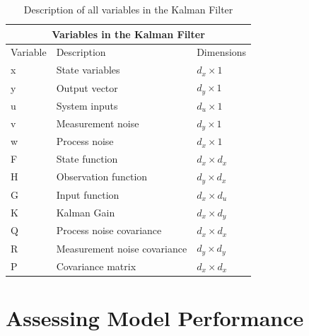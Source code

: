 \begin{center}
\begin{table}
\centering
\caption{Description of all variables in the Kalman Filter} \label{tab:sometab}
\begin{tabular}{ |p{2cm}||p{5cm}|p{2cm}| }
    \hline
    \multicolumn{3}{|c|}{Variables in the Kalman Filter } \\ 
    \hline
    Variable & Description & Dimensions \\
    \hline
    x & State variables  & $d_x \times 1$ \\
    y & Output vector  & $d_y \times 1$ \\
    u & System inputs  & $d_u \times 1$\\
    v & Measurement noise & $d_y \times 1$\\
    w & Process noise & $d_x \times 1$\\
    F & State function  & $d_x \times d_x $  \\ 
    H & Observation function & $d_y \times d_x$\\
    G & Input function & $d_x \times d_u$\\
    K & Kalman Gain  & $d_x \times d_y$\\
    Q & Process noise covariance  & $d_x \times d_x$ \\
    R & Measurement noise covariance &  $d_y \times d_y$\\
    P & Covariance matrix & $d_x \times d_x $  \\ 
    
    \hline
\end{tabular}

\end{table}
\end{center} 

\newpage

\section{Assessing Model Performance}



